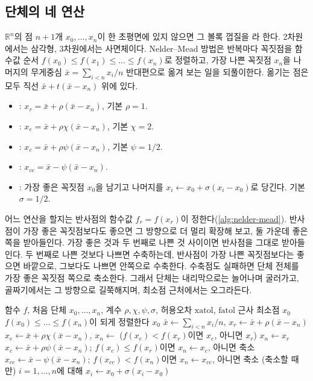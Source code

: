 \subsection{단체의 네 연산}

$\mathbb R^n$의 점 $n+1$개 $x_0,\dots,x_n$이 한 초평면에 있지 않으면 그 볼록 껍질을 라 한다. 2차원에서는 삼각형, 3차원에서는 사면체이다. Nelder--Mead 방법은 반복마다 꼭짓점을 함수값 순서 $f(x_0)\le f(x_1)\le\dots\le f(x_n)$로 정렬하고, 가장 나쁜 꼭짓점 $x_n$을 나머지의 무게중심 $\bar x=\sum_{i<n}x_i/n$ 반대편으로 옮겨 보는 일을 되풀이한다. 옮기는 점은 모두 직선 $\bar x+t(\bar x-x_n)$ 위에 있다.
\begin{itemize}
\item {}: $x_r=\bar x+\rho(\bar x-x_n)$, 기본 $\rho=1$.
\item {}: $x_e=\bar x+\rho\chi(\bar x-x_n)$, 기본 $\chi=2$.
\item {}: $x_c=\bar x+\rho\psi(\bar x-x_n)$, 기본 $\psi=1/2$.
\item {}: $x_{cc}=\bar x-\psi(\bar x-x_n)$.
\item {}: 가장 좋은 꼭짓점 $x_0$을 남기고 나머지를 $x_i\gets x_0+\sigma(x_i-x_0)$로 당긴다. 기본 $\sigma=1/2$.
\end{itemize}
어느 연산을 할지는 반사점의 함수값 $f_r=f(x_r)$이 정한다(\cref{alg:nelder-mead}). 반사점이 가장 좋은 꼭짓점보다도 좋으면 그 방향으로 더 멀리 확장해 보고, 둘 가운데 좋은 쪽을 받아들인다. 가장 좋은 것과 두 번째로 나쁜 것 사이이면 반사점을 그대로 받아들인다. 두 번째로 나쁜 것보다 나쁘면 수축하는데, 반사점이 가장 나쁜 꼭짓점보다는 좋으면 바깥으로, 그보다도 나쁘면 안쪽으로 수축한다. 수축점도 실패하면 단체 전체를 가장 좋은 꼭짓점 쪽으로 축소한다. 그래서 단체는 내리막으로는 늘어나며 굴러가고, 골짜기에서는 그 방향으로 길쭉해지며, 최소점 근처에서는 오그라든다.

\begin{algorithm}[t]
\begin{algorithmic}[1]
\Require 함수 $f$, 처음 단체 $x_0,\dots,x_n$, 계수 $\rho,\chi,\psi,\sigma$, 허용오차 $\mathrm{xatol}$, $\mathrm{fatol}$
\Ensure 근사 최소점 $x_0$
\Loop
  \State $f(x_0)\le\dots\le f(x_n)$이 되게 정렬한다
   \Return $x_0$ \EndIf
  \State $\bar x\gets\sum_{i<n}x_i/n$, $x_r\gets\bar x+\rho(\bar x-x_n)$
    \State $x_e\gets\bar x+\rho\chi(\bar x-x_n)$, $x_n\gets$ ($f(x_e)<f(x_r)$이면 $x_e$, 아니면 $x_r$)
    \State $x_n\gets x_r$
    \State $x_c\gets\bar x+\rho\psi(\bar x-x_n)$; $f(x_c)\le f(x_r)$이면 $x_n\gets x_c$, 아니면 축소
  \Else
    \State $x_{cc}\gets\bar x-\psi(\bar x-x_n)$; $f(x_{cc})<f(x_n)$이면 $x_n\gets x_{cc}$, 아니면 축소
  \EndIf
  \State (축소할 때만) $i=1,\dots,n$에 대해 $x_i\gets x_0+\sigma(x_i-x_0)$
\EndLoop
\end{algorithmic}
\caption{Nelder--Mead 방법(scipy의 순서)}
\label{alg:nelder-mead}
\end{algorithm}

